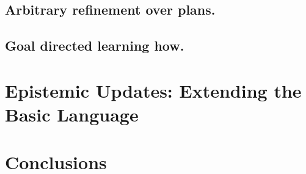 \documentclass[sn-mathphys-num]{sn-jnl}%
\begin{document}
\subsection{Arbitrary refinement over plans.}
\label{sec:aref}


\subsection{Goal directed learning how.}
\label{sec:learning}


\section{Epistemic Updates: Extending the Basic Language}
\label{sec:extension}













\section{Conclusions}
\label{sec:final}


%  


\appendix

\end{document}
